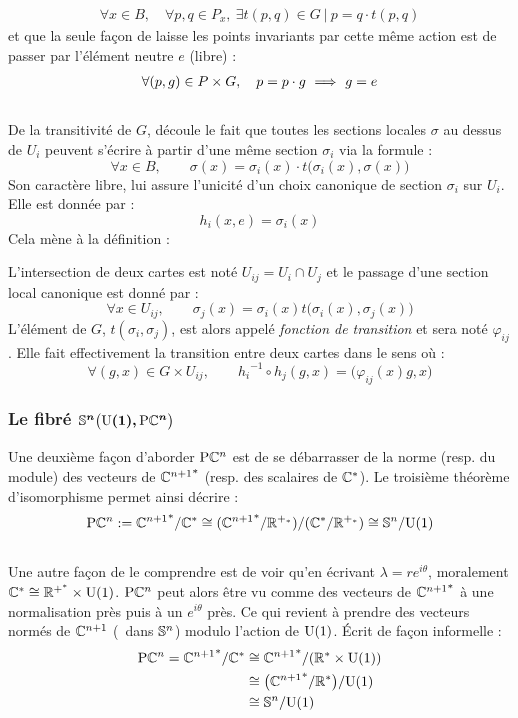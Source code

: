 \begin{align*}
	\forall x\in B,\quad \forall p,q\in P_x,\ \exists t(p,q)\in G\ |\ p = q\cdot t(p,q) 
\end{align*}
et que la seule façon de laisse les points invariants par cette même action est de passer par l'élément neutre $e$ (libre) :
\begin{align*}
	\forall (p,g)\in P\times G,\quad p = p\cdot g\ \Lr\ g=e
\end{align*}
\\
De la transitivité de $G$, découle le fait que toutes les sections locales $\sigma$ au dessus de $U_i$ peuvent s'écrire à partir d'une même section $\sigma_i$ via la formule :
\[\forall x\in B,\qquad \sigma(x) = \sigma_i(x) \cdot t\big(\sigma_i(x), \sigma(x)\big)\]
Son caractère libre, lui assure l'unicité d'un choix canonique de section $\sigma_i$ sur $U_i$. Elle est donnée par :
\[{h_i}(x,e) = \sigma_i(x)\]
Cela mène à la définition :
\begin{definition}
	L'intersection de deux cartes  est noté $U_{ij} = U_i\cap U_j$ et le passage d'une section local canonique est donné par :
	\[\forall x\in U_{ij},\qquad \sigma_j(x) = \sigma_i(x) t\big(\sigma_i(x), \sigma_j(x)\big)\]
	L'élément de $G$, $t(\sigma_i, \sigma_j)$, est alors appelé \emph{fonction de transition} et sera noté $\varphi_{ij}$. Elle fait effectivement la transition entre deux cartes dans le sens où :
	\[\forall (g,x)\in G\times U_{ij},\qquad {h_i}^{-1} \circ h_j(g,x) = \big( \varphi_{ij}(x)g, x \big)\]
\end{definition}
\skipl




\subsubsection{Le fibré $\bf{\VFP}$}\label{subsec:SUPC_VFP}

Une deuxième façon d'aborder $\PC{n}$ est de se débarrasser de la norme (resp. du module) des vecteurs de ${\C^{n+1}}^*$ (resp. des scalaires de $\C^*$). Le troisième théorème d'isomorphisme permet ainsi décrire :
\[\PC{n} \defeq {\C^{n+1}}^*/\C^* \cong ({\C^{n+1}}^* / \R^{+_*})/(\C^* / \R^{+_*}) \cong \S{n}/\U{1}\]
\\
Une autre façon de le comprendre est de voir qu'en écrivant $\lambda=re^{i\theta}$, moralement $\C^*\cong \R^{+^*}\times \U{1}$. $\PC{n}$ peut alors être vu comme des vecteurs de ${\C^{n+1}}^*$ à une normalisation près puis à un $e^{i\theta}$ près. Ce qui revient à prendre des vecteurs normés de $\C^{n+1}$ (\ie~dans $\S{n}$) modulo l'action de $\U{1}$. Écrit de façon informelle :
\begin{align*}
	\PC{n} = {\C^{n+1}}^*/\C^* &\cong {\C^{n+1}}^*/(\R^* \times \U{1}) \\
	&\cong \big( {\C^{n+1}}^*/\R^* \big) /\U{1} \\
	&\cong \S{n}  / \U{1}
\end{align*}
\skipl

